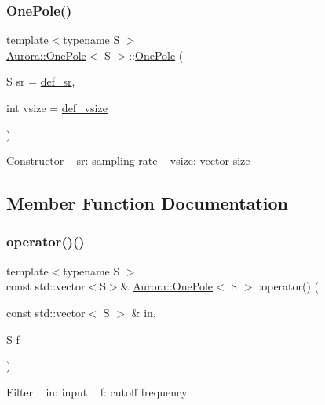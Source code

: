 \subsubsection{\texorpdfstring{One\+Pole()}{OnePole()}}
{\footnotesize\ttfamily template$<$typename S $>$ \\
\hyperlink{class_aurora_1_1_one_pole}{Aurora\+::\+One\+Pole}$<$ S $>$\+::\hyperlink{class_aurora_1_1_one_pole}{One\+Pole} (\begin{DoxyParamCaption}\item[{S}]{sr = {\ttfamily \hyperlink{namespace_aurora_ad49263d809bea98dd422e95bc91bc03e}{def\+\_\+sr}},  }\item[{int}]{vsize = {\ttfamily \hyperlink{namespace_aurora_afaaddf667a06e7ce23c667a8b7295263}{def\+\_\+vsize}} }\end{DoxyParamCaption})\hspace{0.3cm}{\ttfamily [inline]}}

Constructor ~\newline
sr\+: sampling rate ~\newline
vsize\+: vector size 

\subsection{Member Function Documentation}
\mbox{\label{class_aurora_1_1_one_pole_a34c297cdef0928ffd6e13e0603c5ef9d}} 
\subsubsection{\texorpdfstring{operator()()}{operator()()}\hspace{0.1cm}{\footnotesize\ttfamily [1/2]}}
{\footnotesize\ttfamily template$<$typename S $>$ \\
const std\+::vector$<$S$>$\& \hyperlink{class_aurora_1_1_one_pole}{Aurora\+::\+One\+Pole}$<$ S $>$\+::operator() (\begin{DoxyParamCaption}\item[{const std\+::vector$<$ S $>$ \&}]{in,  }\item[{S}]{f }\end{DoxyParamCaption})\hspace{0.3cm}{\ttfamily [inline]}}

Filter ~\newline
in\+: input ~\newline
f\+: cutoff frequency ~\newline
\mbox{\label{class_aurora_1_1_one_pole_ab126ef60b5f354c5aec0b62636bbb01d}} 
